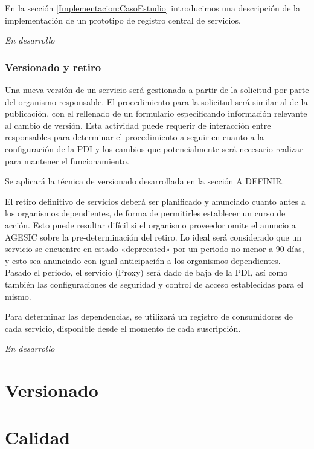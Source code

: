       En la sección \ref{Implementacion:CasoEstudio} introducimos una descripción de la implementación de un prototipo de registro central de servicios.

      \emph{En desarrollo}

    \subsubsection{Versionado y retiro}
      Una nueva versión de un servicio será gestionada a partir de la solicitud por parte del organismo responsable. El procedimiento para la solicitud será similar al de la publicación, con el rellenado de un formulario especificando información relevante al cambio de versión. Esta actividad puede requerir de interacción entre responsables para determinar el procedimiento a seguir en cuanto a la configuración de la PDI y los cambios que potencialmente será necesario realizar para mantener el funcionamiento.

      Se aplicará la técnica de versionado desarrollada en la sección A DEFINIR.

      El retiro definitivo de servicios deberá ser planificado y anunciado cuanto antes a los organismos dependientes, de forma de permitirles establecer un curso de acción. Esto puede resultar difícil si el organismo proveedor omite el anuncio a AGESIC sobre la pre-determinación del retiro. Lo ideal será considerado que un servicio se encuentre en estado «deprecated» por un periodo no menor a 90 días, y esto sea anunciado con igual anticipación a los organismos dependientes. Pasado el periodo, el servicio (Proxy) será dado de baja de la PDI, así como también las configuraciones de seguridad y control de acceso establecidas para el mismo.

      Para determinar las dependencias, se utilizará un registro de consumidores de cada servicio, disponible desde el momento de cada suscripción.

      \emph{En desarrollo}

\section{Versionado}
\label{Solucion:Versionado}

\section{Calidad}
\label{Solucion:Calidad}

